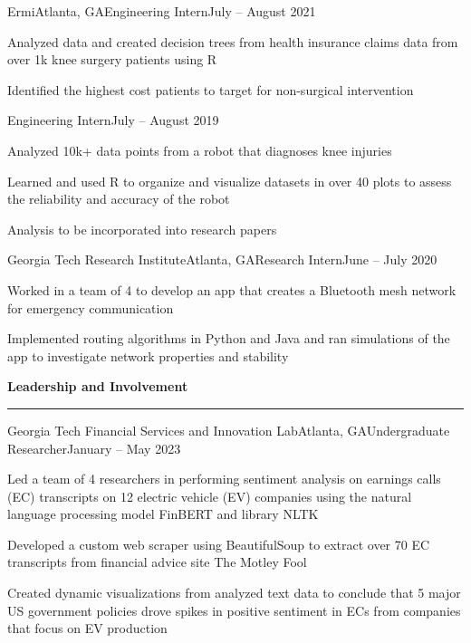 \documentclass{article}
\newcommand{\horizontal}{\vspace{2pt}\hrule}
\newcommand{\sectitle}[1]{\vspace{2pt} \textbf{\large #1} \horizontal}
\begin{document}
\begin{flushleft}
    \begin{experience}{Ermi}{Atlanta, GA}{Engineering Intern}{July -- August 2021}
        \item Analyzed data and created decision trees from health insurance claims data from over 1k knee surgery patients using R
        \item Identified the highest cost patients to target for non-surgical intervention
    \end{experience}
    \begin{subexperience}{Engineering Intern}{July -- August 2019}
        \item Analyzed 10k+ data points from a robot that diagnoses knee injuries
        \item Learned and used R to organize and visualize datasets in over 40 plots to assess the reliability and accuracy of the robot
        \item Analysis to be incorporated into research papers
    \end{subexperience}

    \begin{experience}{Georgia Tech Research Institute}{Atlanta, GA}{Research Intern}{June -- July 2020}
        \item Worked in a team of 4 to develop an app that creates a Bluetooth mesh network for emergency communication
        \item Implemented routing algorithms in Python and Java and ran simulations of the app to investigate network properties and stability
    \end{experience}


\sectitle{Leadership and Involvement}

    \begin{experience}{Georgia Tech Financial Services and Innovation Lab}{Atlanta, GA}{Undergraduate Researcher}{January -- May 2023}
        \item Led a team of 4 researchers in performing sentiment analysis on earnings calls (EC) transcripts on 12 electric vehicle (EV) companies using the natural language processing model FinBERT and library NLTK
        \item Developed a custom web scraper using BeautifulSoup to extract over 70 EC transcripts from financial advice site The Motley Fool
        \item Created dynamic visualizations from analyzed text data to conclude that 5 major US government policies drove spikes in positive sentiment in ECs from companies that focus on EV production
    \end{experience}



\end{flushleft}
\end{document}
